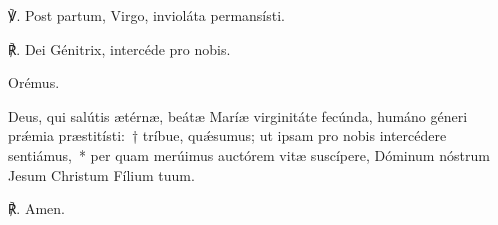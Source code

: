 
\noindent ℣. Post partum, Virgo, invioláta permansísti.

\noindent ℟. Dei Génitrix, intercéde pro nobis.

Orémus.

\noindent Deus, qui salútis ætérnæ, beátæ Maríæ virginitáte fecúnda, humáno géneri prǽmia præstitísti:~† tríbue, quǽsumus; ut ipsam pro nobis intercédere sentiámus,~* per quam merúimus auctórem vitæ suscípere, Dóminum nóstrum Jesum Christum Fílium tuum. 

℟. Amen.